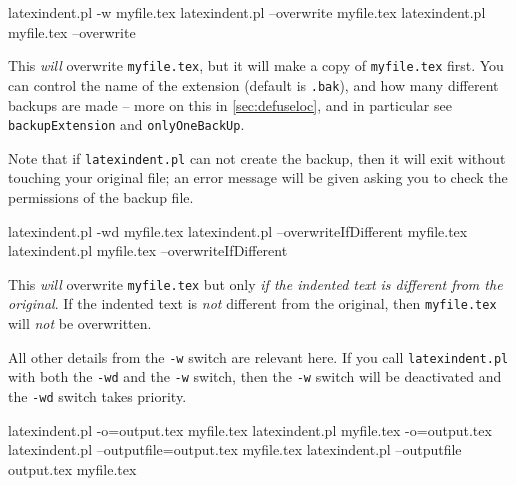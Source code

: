 
 \begin{commandshell}
latexindent.pl -w myfile.tex
latexindent.pl --overwrite myfile.tex
latexindent.pl myfile.tex --overwrite 
\end{commandshell}

 This \emph{will} overwrite \texttt{myfile.tex}, but it will make a copy of
 \texttt{myfile.tex} first. You can control the name of the extension (default is
 \texttt{.bak}), and how many different backups are made -- more on this in
 \cref{sec:defuseloc}, and in particular see \texttt{backupExtension} and
 \texttt{onlyOneBackUp}.

 Note that if \texttt{latexindent.pl} can not create the backup, then it will exit
 without touching your original file; an error message will be given asking you to check
 the permissions of the backup file.


 \begin{commandshell}
latexindent.pl -wd myfile.tex
latexindent.pl --overwriteIfDifferent myfile.tex
latexindent.pl myfile.tex --overwriteIfDifferent
\end{commandshell}

 This \emph{will} overwrite \texttt{myfile.tex} but only \emph{if the indented text is
 different from the original}. If the indented text is \emph{not} different from the
 original, then \texttt{myfile.tex} will \emph{not} be overwritten.

 All other details from the \texttt{-w} switch are relevant here. If you call
 \texttt{latexindent.pl} with both the \texttt{-wd} and the \texttt{-w} switch, then the
 \texttt{-w} switch will be deactivated and the \texttt{-wd} switch takes priority.


 \begin{commandshell} 
latexindent.pl -o=output.tex myfile.tex
latexindent.pl myfile.tex -o=output.tex 
latexindent.pl --outputfile=output.tex myfile.tex
latexindent.pl --outputfile output.tex myfile.tex
\end{commandshell}

